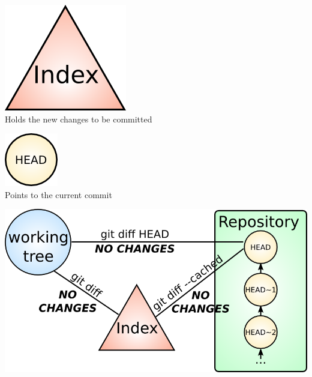 \begin{frame}

  \begin{center}
    \includegraphics[width=.25\textwidth]{images/git-index.png}\\\vspacing
    \Large{Holds the new changes to be committed}
  \end{center}
\end{frame}


\begin{frame}

  \begin{center}
    \includegraphics[width=.25\textwidth]{images/git-head.png}\\\vspacing
    \Large{Points to the current commit}
  \end{center}
\end{frame}


\begin{frame}[plain]

  \begin{center}
    \includegraphics[width=1.0\textwidth]{images/git-diffs.png}
  \end{center}
\end{frame}

